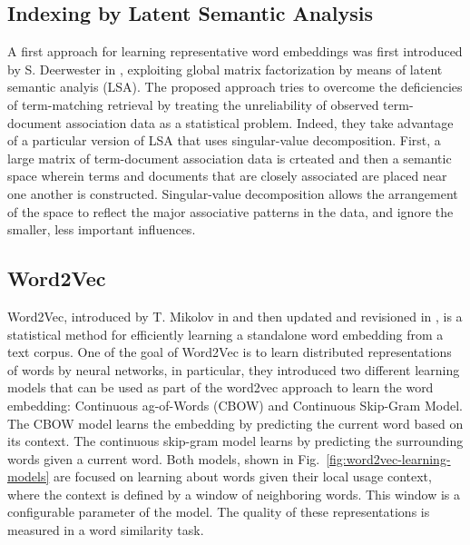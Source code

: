 \subsection{Indexing by Latent Semantic Analysis}

A first approach for learning representative word embeddings was first
introduced by S. Deerwester \etal{} in , exploiting global matrix factorization by means of latent
semantic analyis (LSA). The proposed approach tries to overcome the
deficiencies of term-matching retrieval by treating the unreliability
of observed term-document association data as a statistical problem.
Indeed, they take advantage of a particular version of LSA that uses
singular-value decomposition. First, a large matrix of term-document
association data is crteated and then a semantic space wherein terms
and documents that are closely associated are placed near one another
is constructed. Singular-value decomposition allows the arrangement of
the space to reflect the major associative patterns in the data, and
ignore the smaller, less important influences.

\subsection{Word2Vec}

Word2Vec, introduced by T. Mikolov in  and then
updated and revisioned in , is a statistical
method for efficiently learning a standalone word embedding from a
text corpus. One of the goal of Word2Vec is to learn distributed
representations of words by neural networks, in particular, they
introduced two different learning models that can be used as part of
the word2vec approach to learn the word embedding: Continuous
ag-of-Words (CBOW) and Continuous Skip-Gram Model. The CBOW model
learns the embedding by predicting the current word based on its
context. The continuous skip-gram model learns by predicting the
surrounding words given a current word. Both models, shown in
Fig.~\ref{fig:word2vec-learning-models} are focused on learning about
words given their local usage context, where the context is defined by
a window of neighboring words. This window is a configurable parameter
of the model. The quality of these representations is measured in a
word similarity task.


